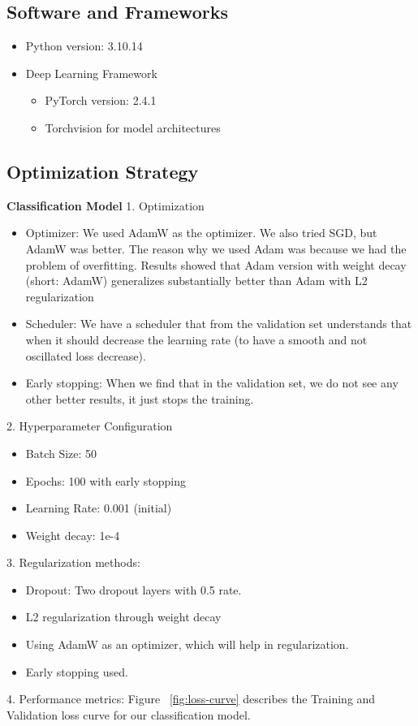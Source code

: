 \documentclass[sigconf, noacm]{acmart}
\begin{document}
\subsection{Software and Frameworks}
\begin{itemize}
    \item Python version: 3.10.14
    \item Deep Learning Framework
    \begin{itemize}
        \item PyTorch version: 2.4.1
    \end{itemize}
    \begin{itemize}
        \item Torchvision for model architectures
    \end{itemize}
\end{itemize}

\subsection{Optimization Strategy}
\textbf{Classification Model}
1.	Optimization
\begin{itemize}
    \item Optimizer: We used AdamW as the optimizer. We also tried SGD, but AdamW was better. The reason why we used Adam was because we had the problem of overfitting. Results showed that Adam version with weight decay (short: AdamW) generalizes substantially better than Adam with L2 regularization~\cite{Loshchilov2017}
    \item Scheduler: We have a scheduler that from the validation set understands that when it should decrease the learning rate (to have a smooth and not oscillated loss decrease).
    \item Early stopping: When we find that in the validation set, we do not see any other better results, it just stops the training.
\end{itemize}
2.	Hyperparameter Configuration 
\begin{itemize}
    \item Batch Size: 50
    \item Epochs: 100 with early stopping
    \item Learning Rate: 0.001 (initial)
    \item Weight decay: 1e-4
\end{itemize}
3.	Regularization methods:
\begin{itemize}
    \item Dropout: Two dropout layers with 0.5 rate.
    \item L2 regularization through weight decay
    \item Using AdamW as an optimizer, which will help in regularization.
    \item Early stopping used.
\end{itemize}
4.	Performance metrics:
Figure ~\ref{fig:loss-curve}  describes the Training and Validation loss curve for our classification model.
\end{document}
